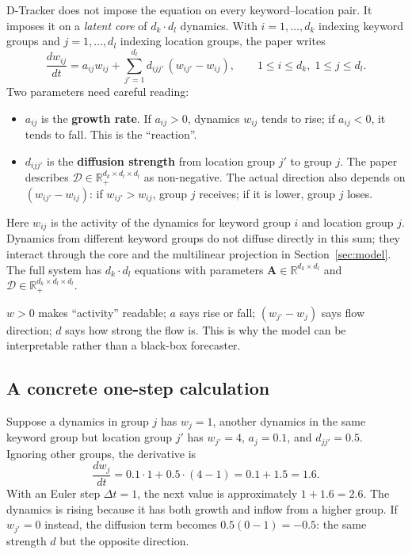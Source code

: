 D-Tracker does not impose the equation on every keyword--location pair. It imposes it on a
\emph{latent core} of $d_k\cdot d_l$ dynamics. With $i=1,\ldots,d_k$ indexing keyword groups and
$j=1,\ldots,d_l$ indexing location groups, the paper writes
\begin{equation}
  \frac{dw_{ij}}{dt}
  =a_{ij}w_{ij}
   +\sum_{j'=1}^{d_l} d_{ijj'}\,(w_{ij'}-w_{ij}),
  \qquad 1\leq i\leq d_k,\;1\leq j\leq d_l.
  \label{eq:rd-latent}
\end{equation}
Two parameters need careful reading:
\begin{itemize}
  \item $a_{ij}$ is the \textbf{growth rate}. If $a_{ij}>0$, dynamics $w_{ij}$ tends to rise; if
        $a_{ij}<0$, it tends to fall. This is the ``reaction''.
  \item $d_{ijj'}$ is the \textbf{diffusion strength} from location group $j'$ to group $j$. The
        paper describes $\mathcal{D}\in\mathbb{R}_{+}^{d_k\times d_l\times d_l}$ as non-negative.
        The actual direction also depends on $(w_{ij'}-w_{ij})$: if $w_{ij'}>w_{ij}$, group $j$
        receives; if it is lower, group $j$ loses.
\end{itemize}

Here $w_{ij}$ is the activity of the dynamics for keyword group $i$ and location group $j$. Dynamics
from different keyword groups do not diffuse directly in this sum; they interact through the core
and the multilinear projection in Section~\ref{sec:model}. The full system has $d_k\cdot d_l$
equations with parameters $\mathbf{A}\in\mathbb{R}^{d_k\times d_l}$ and
$\mathcal{D}\in\mathbb{R}_{+}^{d_k\times d_l\times d_l}$.

\begin{keypoint}
$w>0$ makes ``activity'' readable; $a$ says rise or fall; $(w_{j'}-w_j)$ says flow direction; $d$
says how strong the flow is. This is why the model can be interpretable rather than a black-box
forecaster.
\end{keypoint}

\subsection{A concrete one-step calculation}

Suppose a dynamics in group $j$ has $w_j=1$, another dynamics in the same keyword group but location
group $j'$ has $w_{j'}=4$, $a_j=0.1$, and $d_{jj'}=0.5$. Ignoring other groups, the derivative is
\[
  \frac{dw_j}{dt}=0.1\cdot1+0.5\cdot(4-1)=0.1+1.5=1.6.
\]
With an Euler step $\Delta t=1$, the next value is approximately $1+1.6=2.6$. The dynamics is rising
because it has both growth and inflow from a higher group. If $w_{j'}=0$ instead, the diffusion term
becomes $0.5(0-1)=-0.5$: the same strength $d$ but the opposite direction.

